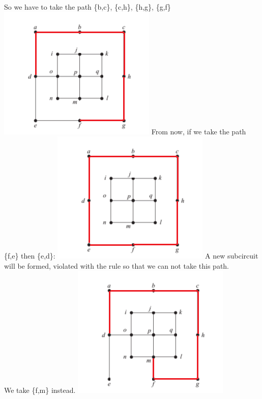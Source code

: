 \documentclass{article}
\begin{document}
So we have to take the path \{b,c\}, \{c,h\}, \{h,g\}, \{g,f\}
\newline
\includegraphics[]{Question 15/connectivity_15.e.1.png}
\newline
From now, if we take the path \{f,e\} then \{e,d\}:
\newline
\includegraphics[]{Question 15/connectivity_15.e.2.png}
\newline
A new subcircuit will be formed, violated with the rule so that we can not take this path.\\
We take \{f,m\} instead.
\newline
\includegraphics[]{Question 15/connectivity_15.e.5.png}
\newline
\end{document}
